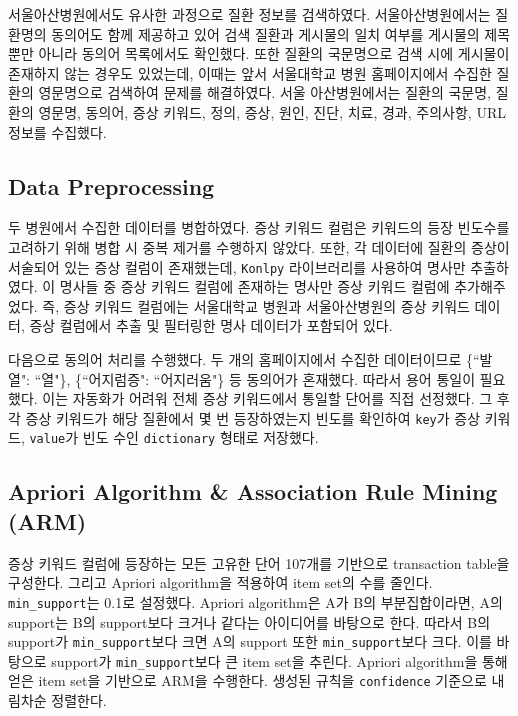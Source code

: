 \documentclass[conference]{IEEEtran}
\begin{document}
서울아산병원에서도 유사한 과정으로 질환 정보를 검색하였다. 서울아산병원에서는 질환명의 동의어도 함께 제공하고 있어 검색 질환과 게시물의 일치 여부를 게시물의 제목 뿐만 아니라 동의어 목록에서도 확인했다. 또한 질환의 국문명으로 검색 시에 게시물이 존재하지 않는 경우도 있었는데, 이때는 앞서 서울대학교 병원 홈페이지에서 수집한 질환의 영문명으로 검색하여 문제를 해결하였다. 서울 아산병원에서는 질환의 국문명, 질환의 영문명, 동의어, 증상 키워드, 정의, 증상, 원인, 진단, 치료, 경과, 주의사항, URL 정보를 수집했다.

\subsection{Data Preprocessing}
두 병원에서 수집한 데이터를 병합하였다. 증상 키워드 컬럼은 키워드의 등장 빈도수를 고려하기 위해 병합 시 중복 제거를 수행하지 않았다. 또한, 각 데이터에 질환의 증상이 서술되어 있는 증상 컬럼이 존재했는데, \verb|Konlpy| 라이브러리를 사용하여 명사만 추출하였다. 이 명사들 중 증상 키워드 컬럼에 존재하는 명사만 증상 키워드 컬럼에 추가해주었다. 즉, 증상 키워드 컬럼에는 서울대학교 병원과 서울아산병원의 증상 키워드 데이터, 증상 컬럼에서 추출 및 필터링한 명사 데이터가 포함되어 있다.

다음으로 동의어 처리를 수행했다. 두 개의 홈페이지에서 수집한 데이터이므로 \{``발열": ``열"\}, \{``어지럼증": ``어지러움"\} 등 동의어가 혼재했다. 따라서 용어 통일이 필요했다. 이는 자동화가 어려워 전체 증상 키워드에서 통일할 단어를 직접 선정했다. 그 후 각 증상 키워드가 해당 질환에서 몇 번 등장하였는지 빈도를 확인하여 \verb|key|가 증상 키워드, \verb|value|가 빈도 수인 \verb|dictionary| 형태로 저장했다.

\subsection{Apriori Algorithm \& Association Rule Mining (ARM)}
증상 키워드 컬럼에 등장하는 모든 고유한 단어 107개를 기반으로 transaction table을 구성한다. 그리고 Apriori algorithm을 적용하여 item set의 수를 줄인다. \verb|min_support|는 0.1로 설정했다. Apriori algorithm은 A가 B의 부분집합이라면, A의 support는 B의 support보다 크거나 같다는 아이디어를 바탕으로 한다. 따라서 B의 support가 \verb|min_support|보다 크면 A의 support 또한 \verb|min_support|보다 크다. 이를 바탕으로 support가 \verb|min_support|보다 큰 item set을 추린다.
Apriori algorithm을 통해 얻은 item set을 기반으로 ARM을 수행한다. 생성된 규칙을 \verb|confidence| 기준으로 내림차순 정렬한다.
\end{document}
